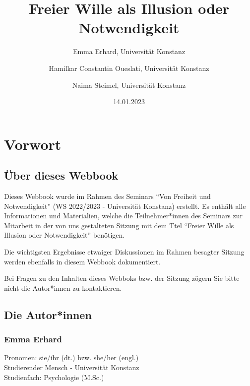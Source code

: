 \documentclass[
  a4paper,
]{report}
\title{Freier Wille als Illusion oder Notwendigkeit}
\author{Emma Erhard, Universität Konstanz \and Hamilkar Constantin Oueslati, Universität Konstanz \and Naima Steimel, Universität Konstanz}
\date{14.01.2023}
\begin{document}
\maketitle

\renewcommand*\contentsname{Inhaltsverzeichnis}
{
\hypersetup{linkcolor=}
\setcounter{tocdepth}{3}
\tableofcontents
}
\hypertarget{vorwort}{%
\chapter*{Vorwort}\label{vorwort}}

\hypertarget{uxfcber-dieses-webbook}{%
\section*{Über dieses Webbook}\label{uxfcber-dieses-webbook}}

Dieses Webbook wurde im Rahmen des Seminars ``Von Freiheit und Notwendigkeit'' (WS 2022/2023 - Universität Konstanz) erstellt.
Es enthält alle Informationen und Materialien, welche die Teilnehmer*innen des Seminars zur Mitarbeit in der von uns gestalteten Sitzung mit dem Ttel ``Freier Wille als Illusion oder Notwendigkeit'' benötigen.

Die wichtigsten Ergebnisse etwaiger Diskussionen im Rahmen besagter Sitzung werden ebenfalls in diesem Webbook dokumentiert.

Bei Fragen zu den Inhalten dieses Webboks bzw. der Sitzung zögern Sie bitte nicht die Autor*innen zu kontaktieren.

\hypertarget{die-autorinnen}{%
\section*{Die Autor*innen}\label{die-autorinnen}}

\hypertarget{emma-erhard}{%
\subsection*{Emma Erhard}\label{emma-erhard}}

Pronomen: sie/ihr (dt.) bzw. she/her (engl.)\\
Studierender Mensch - Universität Konstanz\\
Studienfach: Psychologie (M.Sc.)\\
\end{document}
